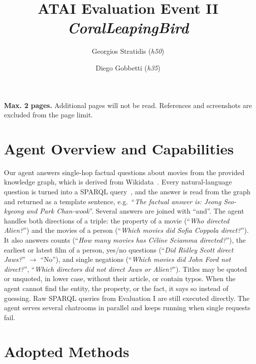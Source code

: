 \documentclass{article}
\begin{document}
\title{ATAI Evaluation Event II\\[0.3em]
\large \textit{CoralLeapingBird}}

\author{
Georgios Stratidis (\textit{h50})
\and
Diego Gobbetti (\textit{h35})
}

\date{}

\maketitle
\noindent
\textbf{Max. 2 pages.} Additional pages will not be read.
References and screenshots are excluded from the page limit.

\section{Agent Overview and Capabilities}

Our agent answers single-hop factual questions about movies from the provided knowledge graph, which is derived from Wikidata~\cite{vrandecic2014wikidata}. Every natural-language question is turned into a SPARQL query~\cite{harris2013sparql}, and the answer is read from the graph and returned as a template sentence, e.g.\ ``\textit{The factual answer is: Jeong Seo-kyeong and Park Chan-wook}''. Several answers are joined with ``and''. The agent handles both directions of a triple: the property of a movie (``\textit{Who directed Alien?}'') and the movies of a person (``\textit{Which movies did Sofia Coppola direct?}''). It also answers counts (``\textit{How many movies has Céline Sciamma directed?}''), the earliest or latest film of a person, yes/no questions (``\textit{Did Ridley Scott direct Jaws?}'' $\rightarrow$ ``No''), and single negations (``\textit{Which movies did John Ford not direct?}'', ``\textit{Which directors did not direct Jaws or Alien?}''). Titles may be quoted or unquoted, in lower case, without their article, or contain typos. When the agent cannot find the entity, the property, or the fact, it says so instead of guessing. Raw SPARQL queries from Evaluation I are still executed directly. The agent serves several chatrooms in parallel and keeps running when single requests fail.

\section{Adopted Methods}
\end{document}
